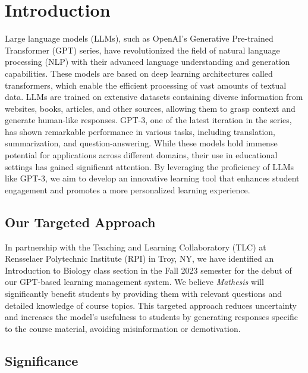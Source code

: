 \documentclass[12pt,a4paper]{article}
\begin{document}
    \pagebreak

    \section{Introduction}

    Large language models (LLMs), such as OpenAI's Generative Pre-trained Transformer (GPT) series,
    have revolutionized the field of natural language processing (NLP) with their advanced language
    understanding and generation capabilities. These models are based on deep learning architectures
    called transformers, which enable the efficient processing of vast amounts of textual data. LLMs
    are trained on extensive datasets containing diverse information from websites, books, articles,
    and other sources, allowing them to grasp context and generate human-like responses. GPT-3, one of
    the latest iteration in the series, has shown remarkable performance in various tasks, including
    translation, summarization, and question-answering. While these models hold immense potential
    for applications across different domains, their use in educational settings has gained significant
    attention. By leveraging the proficiency of LLMs like GPT-3, we aim to develop an innovative
    learning tool that enhances student engagement and promotes a more personalized learning experience.

    \subsection{Our Targeted Approach}

    In partnership with the Teaching and Learning Collaboratory (TLC) at Rensselaer Polytechnic
    Institute (RPI) in Troy, NY, we have identified an Introduction to Biology class section in the
    Fall 2023 semester for the debut of our GPT-based learning management system. We believe \textit{Mathesis}
    will significantly benefit students by providing them with relevant questions and detailed
    knowledge of course topics. This targeted approach reduces uncertainty and increases the model's
    usefulness to students by generating responses specific to the course material, avoiding
    misinformation or demotivation.

    \subsection{Significance}
\end{document}
